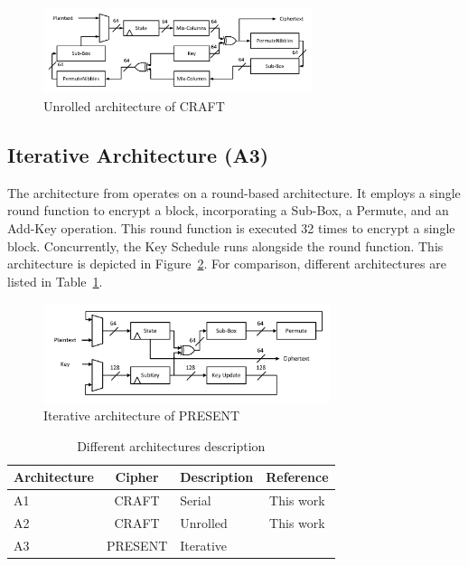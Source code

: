 \documentclass[final,5p,times,twocolumn]{elsarticle}
\begin{document}
\begin{figure}[h]%
    \centering
    \includegraphics[width=0.7\textwidth]{unrolled-archticture.pdf}
    \caption{Unrolled architecture of CRAFT}\label{fig4}
\end{figure}

\subsection{Iterative Architecture (A3)}\label{iterative_architecture}

The architecture from \cite{DBLP:journals/tcas/Lara-NinoDM17} operates on a round-based architecture.
It employs a single round function to encrypt a block, incorporating a Sub-Box, a Permute, and an Add-Key operation.
This round function is executed 32 times to encrypt a single block. Concurrently, the Key Schedule runs alongside the round function.
This architecture is depicted in Figure~\ref{fig5}.
For comparison, different architectures are listed in Table~\ref{tab2}.

\begin{figure}
    \centering
    \includegraphics[width=0.75\textwidth]{iteration-present.pdf}
    \caption{Iterative architecture of PRESENT}\label{fig5}
\end{figure}

\begin{table}[h]
    \centering
    \caption{Different architectures description}\label{tab2}%
    \begin{tabular}{lclc}
        \toprule
        Architecture & Cipher  & Description & Reference                               \\
        \midrule
        A1           & CRAFT   & Serial      & This work                               \\
        A2           & CRAFT   & Unrolled    & This work                               \\
        A3           & PRESENT & Iterative   & \cite{DBLP:journals/tcas/Lara-NinoDM17} \\
        \bottomrule
    \end{tabular}
\end{table}
\end{document}
